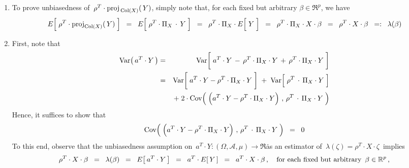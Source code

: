 \begin{enumerate}
\item
	To prove unbiasedness of \,$\rho^{T} \cdot \proj_{\,\Col(X)}(\,Y)$,
	simply note that, for each fixed but arbitrary $\beta \in \Re^{p}$, we have
	\begin{equation*}
	E\!\left[\;\rho^{T} \cdot \proj_{\Col(X)}(\,Y)\;\right]
	\;\; = \;\;
		E\!\left[\;\rho^{T} \cdot \Pi_{X} \overset{{\color{white}+}}{\cdot} Y\;\right]
	\;\; = \;\;
		\rho^{T} \cdot \Pi_{X} \cdot E\!\left[\;\overset{{\color{white}.}}{Y}\;\right]
	\;\; = \;\;
		\rho^{T} \cdot \Pi_{X} \cdot X \cdot \beta
	\;\; = \;\;
		\rho^{T} \cdot X \cdot \beta
	\;\; =: \;\;
		\lambda(\beta)
	\end{equation*}
\item
	First, note that
	\begin{eqnarray*}
	\Var\!\left(\,a^{T} \cdot Y\,\right)
	&=&
		\Var\!\left[\;
			a^{T} \cdot Y
			\,\overset{{\color{white}+}}{-}\,
			\rho^{T} \cdot \Pi_{X} \cdot Y
			\,+\,
			\rho^{T} \cdot \Pi_{X} \cdot Y
			\;\right]
	\\
	&=&
		\Var\!\left[\;
			a^{T} \cdot Y
			\overset{{\color{white}+}}{-}
			\rho^{T} \cdot \Pi_{X} \cdot Y
				\;\right]
		\; + \;
		\Var\!\left[\;
			\rho^{T} \overset{{\color{white}+}}{\cdot} \Pi_{X} \cdot Y
			\;\right]
	\\
	&&	+ \;
		2\cdot\Cov\!\left(\;
			\left(a^{T} \cdot Y
			\overset{{\color{white}.}}{-}
			\rho^{T} \cdot \Pi_{X} \cdot Y\right)
			\,,\,
			\rho^{T} \overset{{\color{white}+}}{\cdot} \Pi_{X} \cdot Y
			\;\right)
	\end{eqnarray*}
	Hence, it suffices to show that
	\begin{equation*}
		\Cov\!\left(\;
			\left(a^{T} \cdot Y
			\overset{{\color{white}.}}{-}
			\rho^{T} \cdot \Pi_{X} \cdot Y\right)
			\,,\,
			\rho^{T} \overset{{\color{white}+}}{\cdot} \Pi_{X} \cdot Y
			\;\right)
		\;\; = \;\; 0
	\end{equation*}
	To this end, observe that the unbiasedness assumption on
	\,$a^{T} \cdot Y : (\Omega,\mathcal{A},\mu) \longrightarrow \Re$\.
	as an estimator of
	\,$\lambda(\zeta) = \rho^{T} \cdot X \cdot \zeta$\,
	implies
	\begin{equation*}
	\rho^{T} \cdot X \cdot \beta
	\;\; = \;\;
		\lambda(\beta)
	\;\; = \;\;
		E\!\left[\,a^{T} \cdot Y\,\right]
	\;\; = \;\;
		a^{T} \cdot E\!\left[\,Y\,\right]
	\;\; = \;\;
		a^{T} \cdot X \cdot \beta\,,
	\quad
	\textnormal{for each fixed but arbitrary \,$\beta \in \Re^{p}$}\,,
	\end{equation*}

\end{enumerate}
